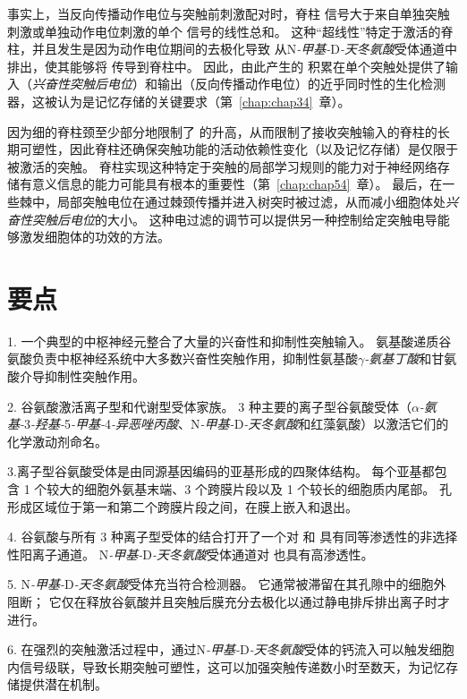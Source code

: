 事实上，当反向传播动作电位与突触前刺激配对时，脊柱  信号大于来自单独突触刺激或单独动作电位刺激的单个  信号的线性总和。
这种“超线性”特定于激活的脊柱，并且发生是因为动作电位期间的去极化导致  从N\textit{-甲基-}D\textit{-天冬氨酸}受体通道中排出，使其能够将  传导到脊柱中。
因此，由此产生的  积累在单个突触处提供了输入（\textit{兴奋性突触后电位}）和输出（反向传播动作电位）的近乎同时性的生化检测器，这被认为是记忆存储的关键要求（第~\ref{chap:chap34}~章）。


因为细的脊柱颈至少部分地限制了  的升高，从而限制了接收突触输入的脊柱的长期可塑性，因此脊柱还确保突触功能的活动依赖性变化（以及记忆存储）是仅限于被激活的突触。
脊柱实现这种特定于突触的局部学习规则的能力对于神经网络存储有意义信息的能力可能具有根本的重要性（第~\ref{chap:chap54}~章）。
最后，在一些棘中，局部突触电位在通过棘颈传播并进入树突时被过滤，从而减小细胞体处\textit{兴奋性突触后电位}的大小。
这种电过滤的调节可以提供另一种控制给定突触电导能够激发细胞体的功效的方法。



\section{要点}

1. 一个典型的中枢神经元整合了大量的兴奋性和抑制性突触输入。
氨基酸递质谷氨酸负责中枢神经系统中大多数兴奋性突触作用，抑制性氨基酸\textit{$\gamma$-氨基丁酸}和甘氨酸介导抑制性突触作用。


2. 谷氨酸激活离子型和代谢型受体家族。
3 种主要的离子型谷氨酸受体（\textit{$\alpha$-氨基-}3\textit{-羟基-}5\textit{-甲基-}4\textit{-异恶唑丙酸}、N\textit{-甲基-}D\textit{-天冬氨酸}和红藻氨酸）以激活它们的化学激动剂命名。


3.离子型谷氨酸受体是由同源基因编码的亚基形成的四聚体结构。 
每个亚基都包含 1 个较大的细胞外氨基末端、3 个跨膜片段以及 1 个较长的细胞质内尾部。
孔形成区域位于第一和第二个跨膜片段之间，在膜上嵌入和退出。


4. 谷氨酸与所有 3 种离子型受体的结合打开了一个对  和  具有同等渗透性的非选择性阳离子通道。
N\textit{-甲基-}D\textit{-天冬氨酸}受体通道对  也具有高渗透性。


5. N\textit{-甲基-}D\textit{-天冬氨酸}受体充当符合检测器。
它通常被滞留在其孔隙中的细胞外  阻断；
它仅在释放谷氨酸并且突触后膜充分去极化以通过静电排斥排出离子时才进行。 


6. 在强烈的突触激活过程中，通过N\textit{-甲基-}D\textit{-天冬氨酸}受体的钙流入可以触发细胞内信号级联，导致长期突触可塑性，这可以加强突触传递数小时至数天，为记忆存储提供潜在机制。 



